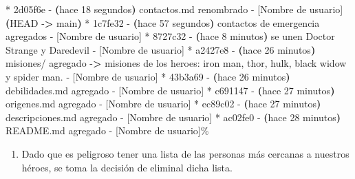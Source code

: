 \documentclass[
]{book}
\newenvironment{Shaded}{\begin{snugshade}}{\end{snugshade}}
\newcommand{\AttributeTok}[1]{\textcolor[rgb]{0.13,0.29,0.53}{#1}}
\newcommand{\ErrorTok}[1]{\textcolor[rgb]{0.64,0.00,0.00}{\textbf{#1}}}
\newcommand{\ExtensionTok}[1]{#1}
\newcommand{\KeywordTok}[1]{\textcolor[rgb]{0.13,0.29,0.53}{\textbf{#1}}}
\newcommand{\NormalTok}[1]{#1}
\newcommand{\OperatorTok}[1]{\textcolor[rgb]{0.81,0.36,0.00}{\textbf{#1}}}
\providecommand{\tightlist}{%
  \setlength{\itemsep}{0pt}\setlength{\parskip}{0pt}}
\begin{document}
\begin{Shaded}
\begin{Highlighting}[]
\ExtensionTok{*}\NormalTok{ 2d05f6e }\AttributeTok{{-}} \ErrorTok{(}\ExtensionTok{hace}\NormalTok{ 18 segundos}\KeywordTok{)} \ExtensionTok{contactos.md}\NormalTok{ renombrado }\AttributeTok{{-}}\NormalTok{ [Nombre de usuario] }\ErrorTok{(}\ExtensionTok{HEAD} \AttributeTok{{-}}\OperatorTok{\textgreater{}}\NormalTok{ main}\KeywordTok{)}
\ExtensionTok{*}\NormalTok{ 1c7fe32 }\AttributeTok{{-}} \ErrorTok{(}\ExtensionTok{hace}\NormalTok{ 57 segundos}\KeywordTok{)} \ExtensionTok{contactos}\NormalTok{ de emergencia agregados }\AttributeTok{{-}}\NormalTok{ [Nombre de usuario]}
\ExtensionTok{*}\NormalTok{ 8727c32 }\AttributeTok{{-}} \ErrorTok{(}\ExtensionTok{hace}\NormalTok{ 8 minutos}\KeywordTok{)} \ExtensionTok{se}\NormalTok{ unen Doctor Strange y Daredevil }\AttributeTok{{-}}\NormalTok{ [Nombre de usuario]}
\ExtensionTok{*}\NormalTok{ a2427e8 }\AttributeTok{{-}} \ErrorTok{(}\ExtensionTok{hace}\NormalTok{ 26 minutos}\KeywordTok{)} \ExtensionTok{misiones/}\NormalTok{ agregado }\AttributeTok{{-}}\OperatorTok{\textgreater{}}\NormalTok{ misiones de los heroes: iron man, thor, hulk, black widow y spider man. }\AttributeTok{{-}}\NormalTok{ [Nombre de usuario]}
\ExtensionTok{*}\NormalTok{ 43b3a69 }\AttributeTok{{-}} \ErrorTok{(}\ExtensionTok{hace}\NormalTok{ 26 minutos}\KeywordTok{)} \ExtensionTok{debilidades.md}\NormalTok{ agregado }\AttributeTok{{-}}\NormalTok{ [Nombre de usuario]}
\ExtensionTok{*}\NormalTok{ c691147 }\AttributeTok{{-}} \ErrorTok{(}\ExtensionTok{hace}\NormalTok{ 27 minutos}\KeywordTok{)} \ExtensionTok{origenes.md}\NormalTok{ agregado }\AttributeTok{{-}}\NormalTok{ [Nombre de usuario]}
\ExtensionTok{*}\NormalTok{ ec89c02 }\AttributeTok{{-}} \ErrorTok{(}\ExtensionTok{hace}\NormalTok{ 27 minutos}\KeywordTok{)} \ExtensionTok{descripciones.md}\NormalTok{ agregado }\AttributeTok{{-}}\NormalTok{ [Nombre de usuario]}
\ExtensionTok{*}\NormalTok{ ac02fe0 }\AttributeTok{{-}} \ErrorTok{(}\ExtensionTok{hace}\NormalTok{ 28 minutos}\KeywordTok{)} \ExtensionTok{README.md}\NormalTok{ agregado }\AttributeTok{{-}}\NormalTok{ [Nombre de usuario]\%   }
\end{Highlighting}
\end{Shaded}

\begin{enumerate}
\def\labelenumi{\arabic{enumi}.}
\setcounter{enumi}{2}
\tightlist
\item
  Dado que es peligroso tener una lista de las personas más cercanas a nuestros héroes, se toma la decisión de eliminal dicha lista.
\end{enumerate}
\end{document}
